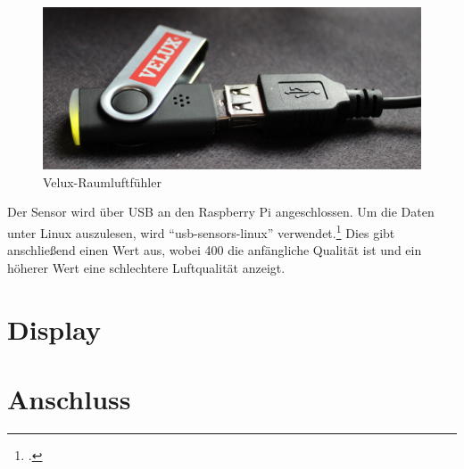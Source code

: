 \begin{figure}[h]
  \centering
     \includegraphics[width=\textwidth]{figures/velux.jpg}
  \caption{Velux-Raumluftfühler}
  \label{fig:velux}
\end{figure}

Der Sensor wird über USB an den Raspberry Pi angeschlossen. Um die Daten unter Linux auszulesen, wird \enquote{usb-sensors-linux} verwendet.\footcite{usb-sensors-linux}
Dies gibt anschließend einen Wert aus, wobei 400  die anfängliche Qualität ist und ein höherer Wert eine schlechtere Luftqualität anzeigt.

\section{Display}
\section{Anschluss}
